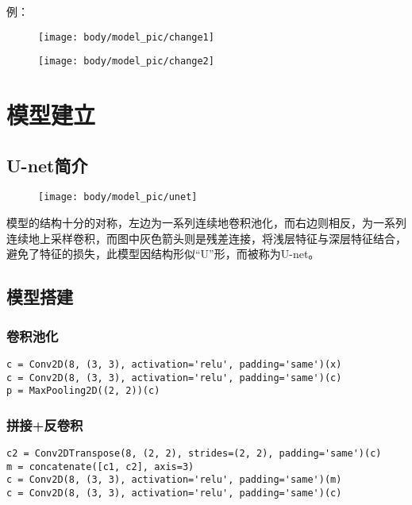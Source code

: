 例：

\begin{figure}
\centering
\texttt{[image: body/model\_pic/change1]}
\caption{}
\end{figure}

\begin{figure}
\centering
\texttt{[image: body/model\_pic/change2]}
\caption{}
\end{figure}

\chapter{模型建立}

\section{U-net简介}

\begin{figure}
\centering
\texttt{[image: body/model\_pic/unet]}
\caption{}
\end{figure}

模型的结构十分的对称，左边为一系列连续地卷积池化，而右边则相反，为一系列连续地上采样卷积，而图中灰色箭头则是残差连接，将浅层特征与深层特征结合，避免了特征的损失，此模型因结构形似``U''形，而被称为U-net。

\section{模型搭建}

\subsection{卷积池化}

\begin{verbatim}
c = Conv2D(8, (3, 3), activation='relu', padding='same')(x)
c = Conv2D(8, (3, 3), activation='relu', padding='same')(c)
p = MaxPooling2D((2, 2))(c)
\end{verbatim}

\subsection{拼接+反卷积}

\begin{verbatim}
c2 = Conv2DTranspose(8, (2, 2), strides=(2, 2), padding='same')(c)
m = concatenate([c1, c2], axis=3)
c = Conv2D(8, (3, 3), activation='relu', padding='same')(m)
c = Conv2D(8, (3, 3), activation='relu', padding='same')(c)
\end{verbatim}

